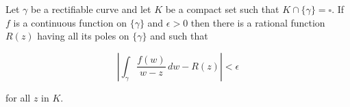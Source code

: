 Let $\gamma$ be a rectifiable curve and let $K$ be a compact set such that $K \cap \{\gamma\} = \square$. If $f$ is a continuous function on $\{\gamma\}$ and $\epsilon > 0$ then there is a rational function $R(z)$ having all its poles on $\{\gamma\}$ and such that

$$\left| \int_{\gamma} \frac{f(w)}{w-z} \, dw - R(z) \right| < \epsilon$$

for all $z$ in $K$.